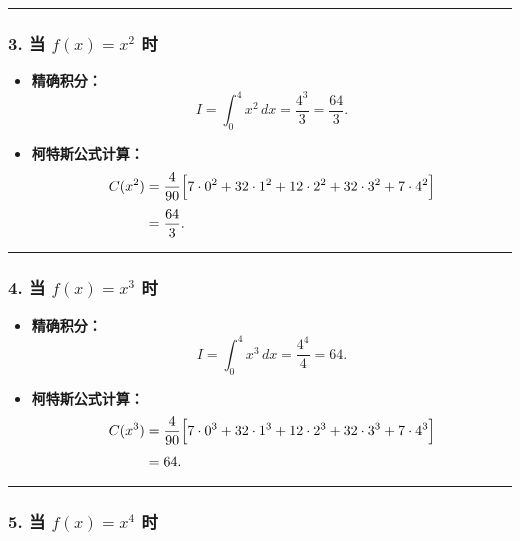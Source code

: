 \documentclass[11pt]{article}
\begin{document}
\begin{center}\rule{0.5\linewidth}{0.5pt}\end{center}

\subsubsection{\texorpdfstring{3. 当 \(f(x)=x^2\)
时}{3. 当 f(x)=x\^{}2 时}}\label{ux5f53-fxx2-ux65f6}

\begin{itemize}
\item
  \textbf{精确积分：} \[
  I = \int_0^4 x^2\,dx = \frac{4^3}{3} = \frac{64}{3}.
  \]
\item
  \textbf{柯特斯公式计算：} \[
  \begin{aligned}
  C(x^2)
  &=\frac{4}{90}\Bigl[7\cdot0^2+32\cdot1^2+12\cdot2^2+32\cdot3^2+7\cdot4^2\Bigr]\\[1mm]&= \frac{64}{3}.
  \end{aligned}
  \]
\end{itemize}

\begin{center}\rule{0.5\linewidth}{0.5pt}\end{center}

\subsubsection{\texorpdfstring{4. 当 \(f(x)=x^3\)
时}{4. 当 f(x)=x\^{}3 时}}\label{ux5f53-fxx3-ux65f6}

\begin{itemize}
\item
  \textbf{精确积分：} \[
  I = \int_0^4 x^3\,dx = \frac{4^4}{4} = 64.
  \]
\item
  \textbf{柯特斯公式计算：} \[
  \begin{aligned}
  C(x^3)
  &=\frac{4}{90}\Bigl[7\cdot0^3+32\cdot1^3+12\cdot2^3+32\cdot3^3+7\cdot4^3\Bigr]\\[1mm]&= 64.
  \end{aligned}
  \]
\end{itemize}

\begin{center}\rule{0.5\linewidth}{0.5pt}\end{center}

\subsubsection{\texorpdfstring{5. 当 \(f(x)=x^4\)
时}{5. 当 f(x)=x\^{}4 时}}\label{ux5f53-fxx4-ux65f6}
\end{document}
